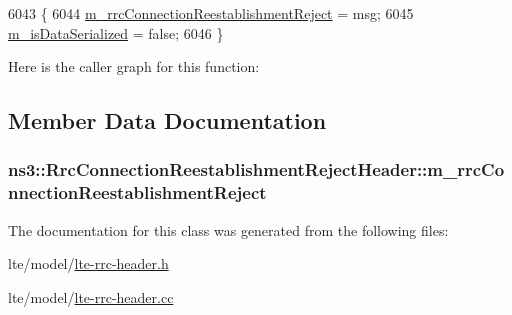 \begin{DoxyCode}
6043 \{
6044   \hyperlink{classns3_1_1RrcConnectionReestablishmentRejectHeader_ad7f78ca10e1ba3583fdd6834673ebb8a}{m\_rrcConnectionReestablishmentReject} = msg;
6045   \hyperlink{classns3_1_1Asn1Header_ae39d42f09e8ec85d8180843625fc92ba}{m\_isDataSerialized} = \textcolor{keyword}{false};
6046 \}
\end{DoxyCode}


Here is the caller graph for this function\+:




\subsection{Member Data Documentation}
\subsubsection[{\texorpdfstring{m\+\_\+rrc\+Connection\+Reestablishment\+Reject}{m_rrcConnectionReestablishmentReject}}]{ ns3\+::\+Rrc\+Connection\+Reestablishment\+Reject\+Header\+::m\+\_\+rrc\+Connection\+Reestablishment\+Reject\hspace{0.3cm}{\ttfamily [private]}}\hypertarget{classns3_1_1RrcConnectionReestablishmentRejectHeader_ad7f78ca10e1ba3583fdd6834673ebb8a}{}\label{classns3_1_1RrcConnectionReestablishmentRejectHeader_ad7f78ca10e1ba3583fdd6834673ebb8a}


The documentation for this class was generated from the following files\+:\begin{DoxyCompactItemize}
\item 
lte/model/\hyperlink{lte-rrc-header_8h}{lte-\/rrc-\/header.\+h}\item 
lte/model/\hyperlink{lte-rrc-header_8cc}{lte-\/rrc-\/header.\+cc}\end{DoxyCompactItemize}
